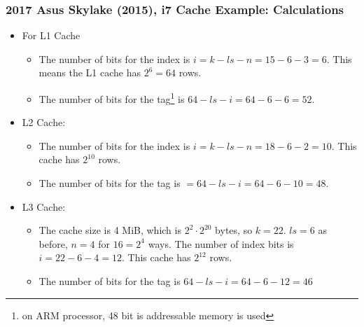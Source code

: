\begin{frame}\frametitle{2017 Asus Skylake (2015), i7 Cache Example: Calculations}
\begin{itemize}
    \item For L1 Cache
    \begin{itemize}
        \item The number of bits for the index is $i=k-ls-n=15-6-3=6$. This means the L1 cache has $2^6=64$ rows.
\item 
The number of bits for the tag\footnote{on ARM processor, 48 bit is addressable memory is used} is $64-ls-i=64-6-6=52$.
    \end{itemize}
    \item L2 Cache:
    \begin{itemize}
        \item The number of bits for the index is $i=k-ls-n=18-6-2=10$. This cache has $2^{10}$ rows.
        \item The number of bits for the tag is $=64-ls-i=64-6-10=48$.
    \end{itemize}
    \item L3 Cache:
    \begin{itemize}
        \item The cache size is 4 MiB, which is $2^2 \cdot 2^{20}$ bytes, so $k=22$. $ls=6$ as before, $n=4$ for $16=2^4$ ways. The number of index bits is $i=22-6-4=12$. This cache has $2^{12}$ rows. 
        \item The number of bits for the tag is $64-ls-i=64-6-12=46 $
    \end{itemize}
\end{itemize}
\end{frame}



